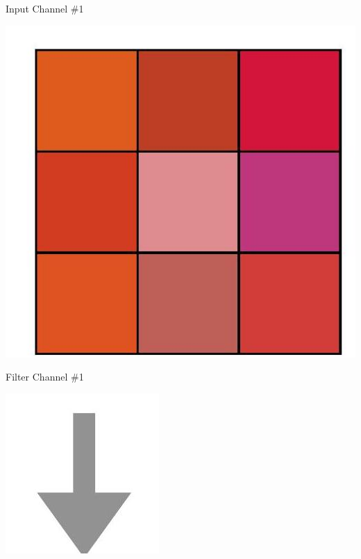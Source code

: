 \documentclass[10pt]{article}
\begin{document}
Input Channel \#1

\begin{center}
\includegraphics[max width=\textwidth]{2024_01_08_959e2db67a31f073f6d2g-07(5)}
\end{center}

Filter Channel \#1

\begin{center}
\includegraphics[max width=\textwidth]{2024_01_08_959e2db67a31f073f6d2g-07(3)}
\end{center}
\end{document}
